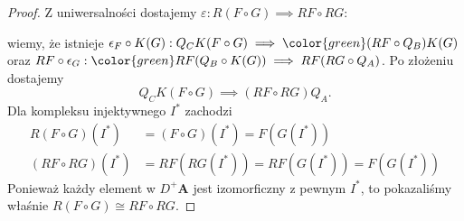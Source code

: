 \begin{proof}
  Z uniwersalności dostajemy $\varepsilon:R(F\circ G)\implies RF\circ RG$:
  \begin{center}\end{center}
  wiemy, że istnieje $\epsilon_F\circ K(G):Q_C K(F\circ G)\implies {\color{green}(RF\circ Q_B) K(G)}$ oraz $RF\circ\epsilon_G:{\color{green}RF(Q_B\circ K(G))}\implies RF(RG\circ Q_A)$. Po złożeniu dostajemy 
  $$Q_CK(F\circ G)\implies (RF\circ RG)Q_A.$$
  Dla kompleksu injektywnego $I^*$ zachodzi
  \begin{align*}
    R(F\circ G)(I^*)&=(F\circ G)(I^*)=F(G(I^*))\\ 
    (RF\circ RG)(I^*)&=RF(RG(I^*))=RF(G(I^*))=F(G(I^*))
  \end{align*}
  Ponieważ każdy element w $D^+\mathbf{A}$ jest izomorficzny z pewnym $I^*$, to pokazaliśmy właśnie $R(F\circ G)\cong RF\circ RG$.
\end{proof}
 
